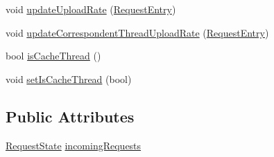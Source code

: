 \begin{DoxyCompactItemize}
\item 
void \hyperlink{classBTPeerWireClientHandlerBase_a27b8eeb61b70127ac8d7652ba1f3fc3a}{update\+Upload\+Rate} (\hyperlink{classRequestEntry}{Request\+Entry})
\item 
void \hyperlink{classBTPeerWireClientHandlerBase_aee6a16181b8ea89f33862f78471374e4}{update\+Correspondent\+Thread\+Upload\+Rate} (\hyperlink{classRequestEntry}{Request\+Entry})
\item 
bool \hyperlink{classBTPeerWireClientHandlerBase_a159dcf796c87781115918534fc7b0fb7}{is\+Cache\+Thread} ()
\item 
void \hyperlink{classBTPeerWireClientHandlerBase_a90af0cb4b355088def3f758a907fbf17}{set\+Is\+Cache\+Thread} (bool)
\end{DoxyCompactItemize}
\subsection*{Public Attributes}
\begin{DoxyCompactItemize}
\item 
\hyperlink{classRequestState}{Request\+State} \hyperlink{classBTPeerWireClientHandlerBase_aa01cf33d132d58a3fd326978b0233ee5}{incoming\+Requests}
\end{DoxyCompactItemize}
